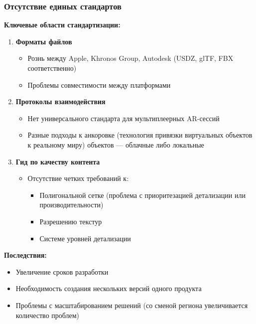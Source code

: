 \subsubsection{Отсутствие единых стандартов}
\textbf{Ключевые области стандартизации:}
\begin{enumerate}
    \item \textbf{Форматы файлов}
    \begin{itemize}
        \item Рознь между Apple, Khronos Group, Autodesk (USDZ, glTF, FBX соответственно)
        \item Проблемы совместимости между платформами
    \end{itemize}
    
    \item \textbf{Протоколы взаимодействия}
    \begin{itemize}
        \item Нет универсального стандарта для мультиплеерных AR-сессий
        \item Разные подходы к анкоровке (технология привязки виртуальных объектов к реальному миру) объектов --- облачные либо локальные
    \end{itemize}
    
    \item \textbf{Гид по качеству контента}
    \begin{itemize}
        \item Отсутствие четких требований к:
        \begin{itemize}
            \item Полигональной сетке (проблема с приоритезацией детализации или производительности)
            \item Разрешению текстур
            \item Системе уровней детализации
        \end{itemize}
    \end{itemize}
\end{enumerate}

\textbf{Последствия:}
\begin{itemize}
    \item Увеличение сроков разработки
    \item Необходимость создания нескольких версий одного продукта
    \item Проблемы с масштабированием решений (со сменой региона увеличивается количество проблем)
\end{itemize}

